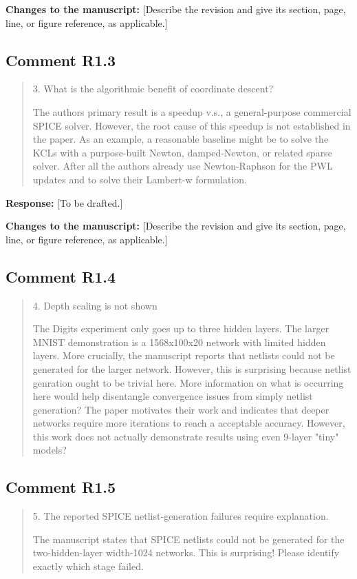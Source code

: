 \documentclass[11pt,a4paper]{article}
\newenvironment{reviewercomment}
  {\begin{quote}\small\color{reviewerblue}}
  {\end{quote}}
\newcommand{\placeholder}[1]{[#1]}
\begin{document}
\noindent\textbf{Changes to the manuscript:}
\placeholder{Describe the revision and give its section, page, line, or figure reference, as applicable.}

\subsection*{Comment R1.3}
\begin{reviewercomment}
3. What is the algorithmic benefit of coordinate descent?

The authors primary result is a speedup v.s., a general-purpose commercial
SPICE solver. However, the root cause of this speedup is not established
in the paper. As an example, a reasonable baseline might be to solve the
KCLs with a purpose-built Newton, damped-Newton, or related sparse solver.
After all the authors already use Newton-Raphson for the PWL updates and
to solve their Lambert-w formulation.
\end{reviewercomment}

\noindent\textbf{Response:}
\placeholder{To be drafted.}

\noindent\textbf{Changes to the manuscript:}
\placeholder{Describe the revision and give its section, page, line, or figure reference, as applicable.}

\subsection*{Comment R1.4}
\begin{reviewercomment}
4. Depth scaling is not shown

The Digits experiment only goes up to three hidden layers. The larger
MNIST demonstration is a 1568x100x20 network with limited hidden layers.
More crucially, the manuscript reports that netlists could not be
generated for the larger network. However, this is surprising because
netlist genration ought to be trivial here. More information on what is
occurring here would help disentangle convergence issues from simply
netlist generation? The paper motivates their work and indicates that
deeper networks require more iterations to reach a acceptable accuracy.
However, this work does not actually demonstrate results using even
9-layer "tiny" models?
\end{reviewercomment}



\subsection*{Comment R1.5}
\begin{reviewercomment}
5. The reported SPICE netlist-generation failures require explanation.

The manuscript states that SPICE netlists could not be generated for the
two-hidden-layer width-1024 networks. This is surprising! Please identify
exactly which stage failed.
\end{reviewercomment}
\end{document}
